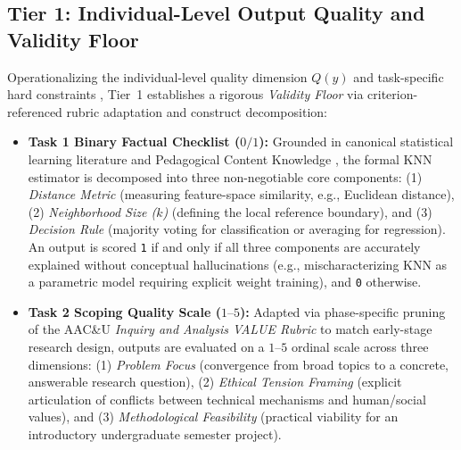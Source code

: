\subsection{Tier 1: Individual-Level Output Quality and Validity Floor}
Operationalizing the individual-level quality dimension $Q(y)$ \cite{Ashkinaze2025} and task-specific hard constraints \cite{Jain2025}, Tier~1 establishes a rigorous \textit{Validity Floor} via criterion-referenced rubric adaptation and construct decomposition:
\begin{itemize}
  \item \textbf{Task 1 Binary Factual Checklist ($0/1$):} Grounded in canonical statistical learning literature \cite{James2021} and Pedagogical Content Knowledge \cite{Shulman1986}, the formal KNN estimator is decomposed into three non-negotiable core components: (1) \textit{Distance Metric} (measuring feature-space similarity, e.g., Euclidean distance), (2) \textit{Neighborhood Size ($k$)} (defining the local reference boundary), and (3) \textit{Decision Rule} (majority voting for classification or averaging for regression). An output is scored \texttt{1} if and only if all three components are accurately explained without conceptual hallucinations (e.g., mischaracterizing KNN as a parametric model requiring explicit weight training), and \texttt{0} otherwise.
  \item \textbf{Task 2 Scoping Quality Scale ($1\text{--}5$):} Adapted via phase-specific pruning of the AAC\&U \textit{Inquiry and Analysis VALUE Rubric} to match early-stage research design, outputs are evaluated on a $1\text{--}5$ ordinal scale across three dimensions: (1) \textit{Problem Focus} (convergence from broad topics to a concrete, answerable research question), (2) \textit{Ethical Tension Framing} (explicit articulation of conflicts between technical mechanisms and human/social values), and (3) \textit{Methodological Feasibility} (practical viability for an introductory undergraduate semester project).
\end{itemize}

